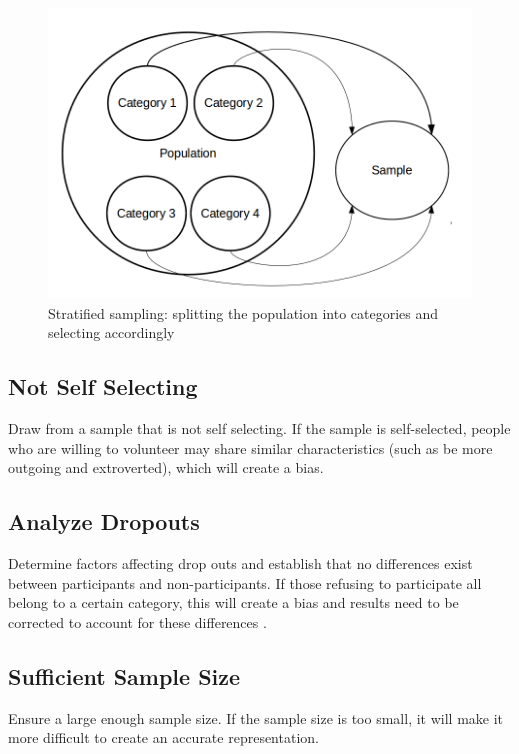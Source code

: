 	\begin{figure}[hbt!]
	\centering
  		\includegraphics[width=0.88\linewidth]{graphics/sample_selection_bias/Stratified_Diagram.png}
  		\caption{Stratified sampling: splitting the population into categories and selecting accordingly}
  		\label{fig:stratified-sampling}
	\end{figure}
	
	
	\subsection{Not Self Selecting}
	
	Draw from a sample that is not self selecting. If the sample is self-selected, people who are willing to volunteer may share similar characteristics (such as be more outgoing and extroverted), which will create a bias.
	
	\subsection{Analyze Dropouts}	
	
	Determine factors affecting drop outs and establish that no differences exist between participants and non-participants. If those refusing to participate all belong to a certain category, this will create a bias and results need to be corrected to account for these differences \citep{AlonsoEtAl2006}.
	
	\subsection{Sufficient Sample Size}
	
	Ensure a large enough sample size. If the sample size is too small, it will make it more difficult to create an accurate representation.
	
